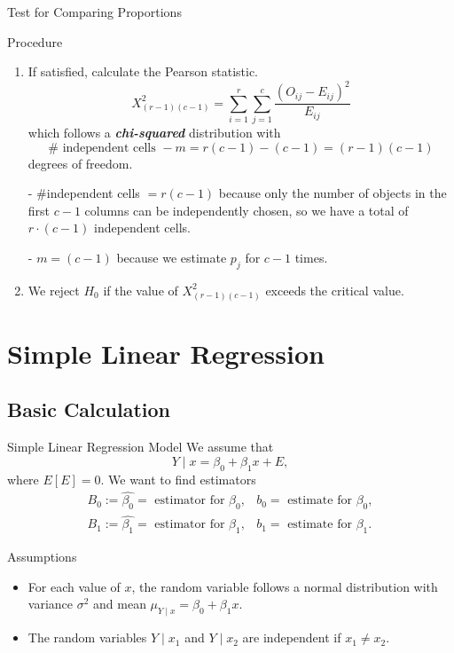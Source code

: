 \documentclass{beamer}
\newcommand{\bb}[1]{\textcolor{antiquefuchsia}{\textbf{\textit{#1}}}}
\begin{document}
\begin{frame}{Test for Comparing Proportions}
\begin{block}{Procedure}
\begin{enumerate}
\item If satisfied, calculate the Pearson statistic.
$$
X_{(r-1)(c-1)}^{2}=\sum_{i=1}^{r} \sum_{j=1}^{c} \frac{\left(O_{i j}-E_{i j}\right)^{2}}{E_{i j}}
$$
which follows a \bb{chi-squared} distribution with
$$
\# \text { independent cells }-m=r(c-1)-(c-1)=(r-1)(c-1)
$$
degrees of freedom.
\begin{center}
- \#independent cells $=r(c-1)$ because only the number of objects in the first $c-1$ columns can be independently chosen, so we have a total of $r \cdot(c-1)$ independent cells.

- $m=(c-1)$ because we estimate $p_{j}$ for $c-1$ times.
\end{center}
\item We reject $H_{0}$ if the value of $X_{(r-1)(c-1)}^{2}$ exceeds the critical value.
\end{enumerate}
\end{block}
\end{frame}

\section{Simple Linear Regression}
\subsection{Basic Calculation}
\begin{frame}{Simple Linear Regression Model}
We assume that
$$
Y \mid x=\beta_{0}+\beta_{1} x+E,
$$
where $E[E]=0$. We want to find estimators
$$
\begin{array}{ll}
B_{0}:=\widehat{\beta_{0}}=\text { estimator for } \beta_{0}, & b_{0}=\text { estimate for } \beta_{0}, \\
B_{1}:=\widehat{\beta_{1}}=\text { estimator for } \beta_{1}, & b_{1}=\text { estimate for } \beta_{1} .
\end{array}
$$
\begin{block}{Assumptions}
\begin{itemize}
\item For each value of $x$, the random variable follows a normal distribution with variance $\sigma^{2}$ and mean $\mu_{Y \mid x}=\beta_{0}+\beta_{1} x$.
\item The random variables $Y \mid x_{1}$ and $Y \mid x_{2}$ are independent if $x_{1} \neq x_{2}$.
\end{itemize}
\end{block}
\end{frame}
\end{document}
